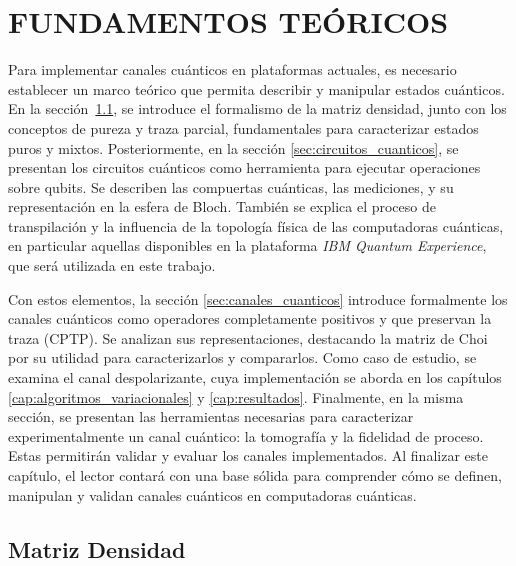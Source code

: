 \documentclass[letterpaper,12pt]{thesisECFM}
\theoremstyle{plain}
\theoremstyle{definition}
\theoremstyle{definition}
\theoremstyle{remark}
\newcommand{\1}{\mathbb{1}}
\begin{document}

\mainmatter
\chapter{FUNDAMENTOS TEÓRICOS} \label{cap:fundamentos:teoricos}
Para implementar canales cuánticos en plataformas actuales, es necesario establecer un marco teórico que permita describir y manipular estados cuánticos. En la sección~\ref{sec:matriz_densidad}, se introduce el formalismo de la matriz densidad, junto con los conceptos de pureza y traza parcial, fundamentales para caracterizar estados puros y mixtos. Posteriormente, en la sección \ref{sec:circuitos_cuanticos}, se presentan los circuitos cuánticos como herramienta para ejecutar operaciones sobre qubits. Se describen las compuertas cuánticas, las mediciones, y su representación en la esfera de Bloch. También se explica el proceso de transpilación y la influencia de la topología física de las computadoras cuánticas, en particular aquellas disponibles en la  plataforma \textit{IBM Quantum Experience}, que será utilizada en este trabajo.

Con estos elementos, la sección \ref{sec:canales_cuanticos} introduce formalmente los canales cuánticos como operadores completamente positivos y que preservan la traza (CPTP). Se analizan sus representaciones, destacando la matriz de Choi por su utilidad para caracterizarlos y compararlos. Como caso de estudio, se examina el canal despolarizante, cuya implementación se aborda en los capítulos \ref{cap:algoritmos_variacionales} y \ref{cap:resultados}. Finalmente, en la misma sección, se presentan las herramientas necesarias para caracterizar experimentalmente un canal cuántico: la tomografía y la fidelidad de proceso. Estas permitirán validar y evaluar los canales implementados. Al finalizar este capítulo, el lector contará con una base sólida para comprender cómo se definen, manipulan y validan canales cuánticos en computadoras cuánticas. 
\section{Matriz Densidad} %
\label{sec:matriz_densidad}
\end{document}
